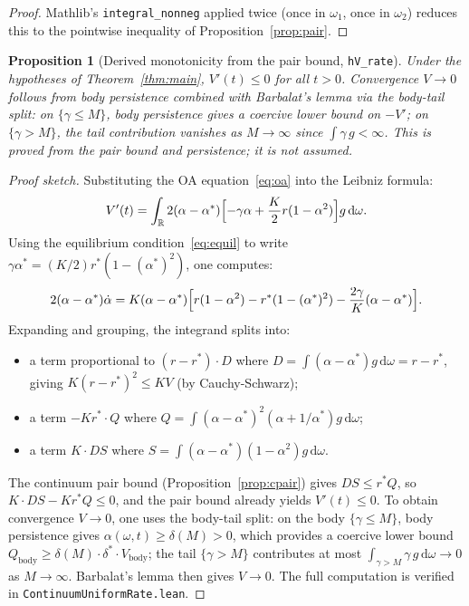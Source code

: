 \documentclass[11pt,a4paper]{article}
\newtheorem{proposition}[theorem]{Proposition}
\theoremstyle{definition}
\newcommand{\R}{\mathbb{R}}
\begin{document}
\begin{proof}
Mathlib's \texttt{integral\_nonneg} applied twice (once in $\omega_1$, once in $\omega_2$) reduces this to the pointwise inequality of Proposition~\ref{prop:pair}.
\end{proof}

\begin{proposition}[Derived monotonicity from the pair bound, \texttt{hV\_rate}]\label{prop:rate}
Under the hypotheses of Theorem~\ref{thm:main}, $V'(t) \leq 0$ for all $t > 0$. Convergence $V \to 0$ follows from body persistence combined with Barbalat's lemma via the body-tail split: on $\{\gamma \leq M\}$, body persistence gives a coercive lower bound on $-V'$; on $\{\gamma > M\}$, the tail contribution vanishes as $M \to \infty$ since $\int \gamma\,g < \infty$. This is \emph{proved} from the pair bound and persistence; it is not assumed.
\end{proposition}

\begin{proof}[Proof sketch]
Substituting the OA equation~\eqref{eq:oa} into the Leibniz formula:
\[
V'(t) = \int_\R 2(\alpha - \alpha^*)\Bigl[-\gamma\alpha + \frac{K}{2}r(1-\alpha^2)\Bigr] g\,\mathrm{d}\omega.
\]
Using the equilibrium condition~\eqref{eq:equil} to write $\gamma\alpha^* = (K/2)r^*(1-(\alpha^*)^2)$, one computes:
\[
2(\alpha-\alpha^*)\dot\alpha = K(\alpha-\alpha^*)\Bigl[r(1-\alpha^2) - r^*(1-(\alpha^*)^2) - \frac{2\gamma}{K}(\alpha-\alpha^*)\Bigr].
\]
Expanding and grouping, the integrand splits into:
\begin{itemize}
\item a term proportional to $(r-r^*) \cdot D$ where $D = \int(\alpha-\alpha^*)g\,\mathrm{d}\omega = r - r^*$, giving $K(r-r^*)^2 \leq KV$ (by Cauchy-Schwarz);
\item a term $-K r^* \cdot Q$ where $Q = \int (\alpha-\alpha^*)^2(\alpha + 1/\alpha^*)g\,\mathrm{d}\omega$;
\item a term $K \cdot DS$ where $S = \int(\alpha-\alpha^*)(1-\alpha^2)g\,\mathrm{d}\omega$.
\end{itemize}
The continuum pair bound (Proposition~\ref{prop:cpair}) gives $DS \leq r^* Q$, so $K \cdot DS - K r^* Q \leq 0$, and the pair bound already yields $V'(t) \leq 0$. To obtain convergence $V \to 0$, one uses the body-tail split: on the body $\{\gamma \leq M\}$, body persistence gives $\alpha(\omega,t) \geq \delta(M) > 0$, which provides a coercive lower bound $Q_{\mathrm{body}} \geq \delta(M) \cdot \delta^* \cdot V_{\mathrm{body}}$; the tail $\{\gamma > M\}$ contributes at most $\int_{\gamma > M} \gamma\,g\,\mathrm{d}\omega \to 0$ as $M \to \infty$. Barbalat's lemma then gives $V \to 0$. The full computation is verified in \texttt{ContinuumUniformRate.lean}.
\end{proof}
\end{document}
